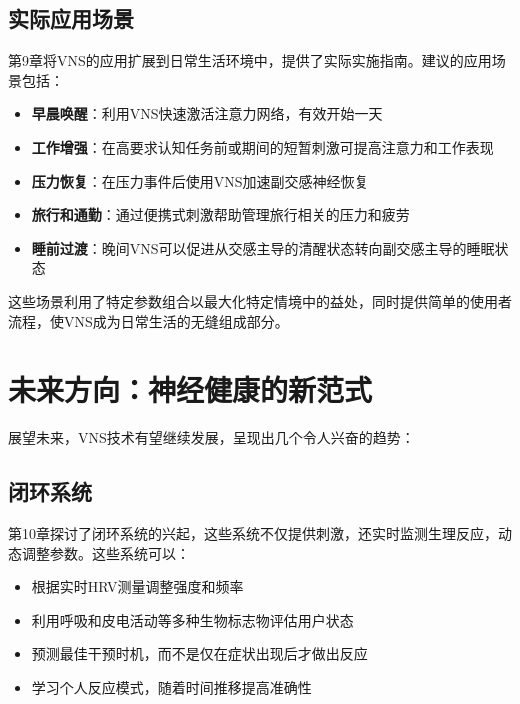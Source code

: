 \documentclass[
  Letterpaper,
]{scrbook}
\providecommand{\tightlist}{%
  \setlength{\itemsep}{0pt}\setlength{\parskip}{0pt}}\usepackage{longtable,booktabs,array}
\begin{document}
\subsection{实际应用场景}\label{ux5b9eux9645ux5e94ux7528ux573aux666f}

第9章将VNS的应用扩展到日常生活环境中，提供了实际实施指南。建议的应用场景包括：

\begin{itemize}
\tightlist
\item
  \textbf{早晨唤醒}：利用VNS快速激活注意力网络，有效开始一天
\item
  \textbf{工作增强}：在高要求认知任务前或期间的短暂刺激可提高注意力和工作表现
\item
  \textbf{压力恢复}：在压力事件后使用VNS加速副交感神经恢复
\item
  \textbf{旅行和通勤}：通过便携式刺激帮助管理旅行相关的压力和疲劳
\item
  \textbf{睡前过渡}：晚间VNS可以促进从交感主导的清醒状态转向副交感主导的睡眠状态
\end{itemize}

这些场景利用了特定参数组合以最大化特定情境中的益处，同时提供简单的使用者流程，使VNS成为日常生活的无缝组成部分。

\section{未来方向：神经健康的新范式}\label{ux672aux6765ux65b9ux5411ux795eux7ecfux5065ux5eb7ux7684ux65b0ux8303ux5f0f}

展望未来，VNS技术有望继续发展，呈现出几个令人兴奋的趋势：

\subsection{闭环系统}\label{ux95edux73afux7cfbux7edf}

第10章探讨了闭环系统的兴起，这些系统不仅提供刺激，还实时监测生理反应，动态调整参数。这些系统可以：

\begin{itemize}
\tightlist
\item
  根据实时HRV测量调整强度和频率
\item
  利用呼吸和皮电活动等多种生物标志物评估用户状态
\item
  预测最佳干预时机，而不是仅在症状出现后才做出反应
\item
  学习个人反应模式，随着时间推移提高准确性
\end{itemize}
\end{document}
